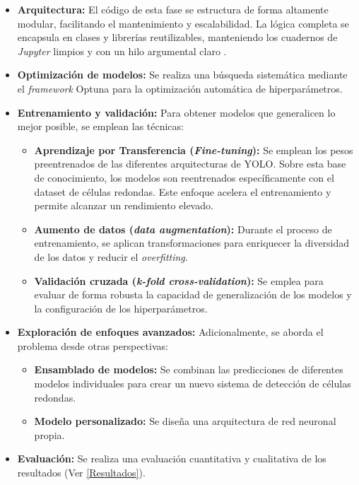 \documentclass[12pt,a4paper,onecolumn,oneside]{report}
\begin{document}
\begin{itemize}
  \item \textbf{Arquitectura:} El código de esta fase se estructura de forma altamente modular, facilitando el mantenimiento y escalabilidad. La lógica completa se encapsula en clases y librerías reutilizables, manteniendo los cuadernos de \textit{Jupyter} 
  limpios y con un hilo argumental claro \cite{repoTFM}.
  \item \textbf{Optimización de modelos:} Se realiza una búsqueda sistemática mediante el \textit{framework} Optuna \cite{Optuna} para la optimización automática de hiperparámetros.
  \item \textbf{Entrenamiento y validación:} Para obtener modelos que generalicen lo mejor posible, se emplean las técnicas:
  \begin{itemize}
    \item \textbf{Aprendizaje por Transferencia (\textit{Fine-tuning}):} Se emplean los pesos preentrenados de las diferentes arquitecturas de YOLO. Sobre esta base de conocimiento,
    los modelos son reentrenados específicamente con el dataset de células redondas. Este enfoque acelera el entrenamiento y permite alcanzar un rendimiento elevado.
    \item \textbf{Aumento de datos (\textit{data augmentation}):} Durante el proceso de entrenamiento, se aplican transformaciones para enriquecer la diversidad de los datos y reducir el \textit{overfitting}.
    \item \textbf{Validación cruzada (\textit{k-fold cross-validation}):} Se emplea para evaluar de forma robusta la capacidad de generalización de los modelos y la configuración de los hiperparámetros.
  \end{itemize} 
  \item \textbf{Exploración de enfoques avanzados:} Adicionalmente, se aborda el problema desde otras perspectivas:
  \begin{itemize}
    \item \textbf{Ensamblado de modelos:} Se combinan las predicciones de diferentes modelos individuales para crear un nuevo sistema de detección de células redondas. 
    \item \textbf{Modelo personalizado:} Se diseña una arquitectura de red neuronal propia. 
  \end{itemize}
  \item \textbf{Evaluación:} Se realiza una evaluación cuantitativa y cualitativa de los resultados (Ver \autoref{Resultados}).
  \begin{itemize}

\end{itemize}
\end{itemize}
\end{document}
